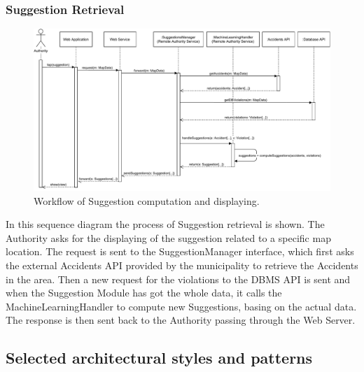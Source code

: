 \documentclass[12pt,a4paper]{article}
\begin{document}
\subsubsection{Suggestion Retrieval}
\begin{figure}[H]
		\centering
		\includegraphics[width=1.0\linewidth]{../assets/sequence_diagrams/exports/workflw_suggestions_complete.pdf}
		\caption{Workflow of Suggestion computation and displaying.}
	\end{figure}
In this sequence diagram the process of Suggestion retrieval is shown. The Authority asks for the displaying of the suggestion related to a specific map location. The request is sent to the SuggestionManager interface, which first asks the external Accidents API provided by the municipality to retrieve the Accidents in the area. Then a new request for the violations to the DBMS API is sent and when the Suggestion Module has got the whole data, it calls the MachineLearningHandler to compute new Suggestions, basing on the actual data. The response is then sent back to the Authority passing through the Web Server.
\newpage
\subsection{Selected architectural styles and patterns}
\end{document}
